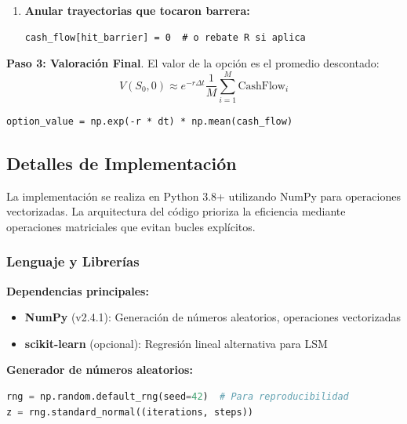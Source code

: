 \begin{enumerate}
    \begin{verbatim}
    exercise = intrinsic[active] > continuation_value
    cash_flow[active][exercise] = intrinsic[active][exercise]
    \end{verbatim}
    
    \item \textbf{Anular trayectorias que tocaron barrera:}
    \begin{verbatim}
cash_flow[hit_barrier] = 0  # o rebate R si aplica
    \end{verbatim}
\end{enumerate}

\textbf{Paso 3: Valoración Final}. El valor de la opción es el promedio descontado:
\begin{equation}
V(S_0, 0) \approx e^{-r\Delta t} \frac{1}{M} \sum_{i=1}^{M} \text{CashFlow}_i
\end{equation}

\begin{verbatim}
option_value = np.exp(-r * dt) * np.mean(cash_flow)
\end{verbatim}

\subsection{Detalles de Implementación}

La implementación se realiza en Python 3.8+ utilizando NumPy para operaciones vectorizadas. La arquitectura del código prioriza la eficiencia mediante operaciones matriciales que evitan bucles explícitos.

\subsubsection{Lenguaje y Librerías}

\textbf{Dependencias principales:}
\begin{itemize}
    \item \textbf{NumPy} (v2.4.1): Generación de números aleatorios, operaciones vectorizadas
    \item \textbf{scikit-learn} (opcional): Regresión lineal alternativa para LSM
\end{itemize}

\textbf{Generador de números aleatorios:}

\begin{lstlisting}[language=Python]
rng = np.random.default_rng(seed=42)  # Para reproducibilidad
z = rng.standard_normal((iterations, steps))
\end{lstlisting}

